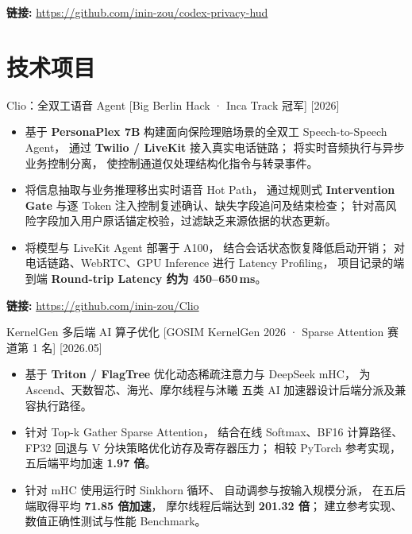 \documentclass{resume}
\newcommand{\DetailFont}{%
  \zihao{-5}
}
\newlength{\EntryGap}
\newlength{\BulletGap}
\newenvironment{resumeBullets}{%
  \begin{itemize}[
    label=\textbullet,
    leftmargin=12pt,
    labelsep=5pt,
    itemsep=\BulletGap,
    parsep=0pt,
    topsep=3pt,
    partopsep=0pt
  ]
}{%
  \end{itemize}
}
\newcommand{\ProjectLink}[1]{%
  \par\nopagebreak
  {\DetailFont
    \textbf{链接:} \url{#1}\par
  }
}
\begin{document}
\ProjectLink{https://github.com/inin-zou/codex-privacy-hud}


\section{技术项目}

\ResumeItem
  {Clio：全双工语音 Agent}
  [Big Berlin Hack · Inca Track 冠军]
  [2026]

\begin{resumeBullets}
  \item 基于 \textbf{PersonaPlex 7B}
  构建面向保险理赔场景的全双工 Speech-to-Speech Agent，
  通过 \textbf{Twilio / LiveKit} 接入真实电话链路；
  将实时音频执行与异步业务控制分离，
  使控制通道仅处理结构化指令与转录事件。

  \item 将信息抽取与业务推理移出实时语音 Hot Path，
  通过规则式 \textbf{Intervention Gate}
  与逐 Token 注入控制复述确认、缺失字段追问及结束检查；
  针对高风险字段加入用户原话锚定校验，过滤缺乏来源依据的状态更新。

  \item 将模型与 LiveKit Agent 部署于 A100，
  结合会话状态恢复降低启动开销；
  对电话链路、WebRTC、GPU Inference 进行 Latency Profiling，
  项目记录的端到端
  \textbf{Round-trip Latency 约为 450--650\,ms}。
\end{resumeBullets}

\ProjectLink{https://github.com/inin-zou/Clio}

\vspace{\EntryGap}

\ResumeItem
  {KernelGen 多后端 AI 算子优化}
  [GOSIM KernelGen 2026 · Sparse Attention 赛道第 1 名]
  [2026.05]

\begin{resumeBullets}
  \item 基于 \textbf{Triton / FlagTree}
  优化动态稀疏注意力与 DeepSeek mHC，
  为 Ascend、天数智芯、海光、摩尔线程与沐曦
  五类 AI 加速器设计后端分派及兼容执行路径。

  \item 针对 Top-k Gather Sparse Attention，
  结合在线 Softmax、BF16 计算路径、
  FP32 回退与 V 分块策略优化访存及寄存器压力；
  相较 PyTorch 参考实现，
  五后端平均加速 \textbf{1.97 倍}。

  \item 针对 mHC 使用运行时 Sinkhorn 循环、
  自动调参与按输入规模分派，
  在五后端取得平均 \textbf{71.85 倍加速}，
  摩尔线程后端达到 \textbf{201.32 倍}；
  建立参考实现、数值正确性测试与性能 Benchmark。
\end{resumeBullets}
\end{document}
